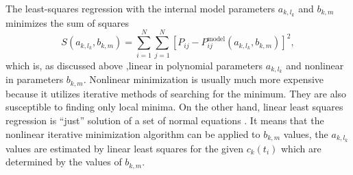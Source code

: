 The least-squares regression with the internal model parameters $a_{k,l_k}$ and
$b_{k,m}$ minimizes the sum of squares
\begin{equation*}
	S(a_{k,l_k},b_{k,m}) = \sum_{i=1}^N{\sum_{j=1}^N{
		\left[P_{ij} - P_{ij}^\text{model}(a_{k,l_k},b_{k,m})\right]^2
	}},
\end{equation*}
which is, as discussed above ,linear in polynomial parameters $a_{k,l_k}$ and
nonlinear in parameters $b_{k,m}$.
Nonlinear minimization is usually much more expensive because it utilizes
iterative methods of searching for the minimum.
They are also susceptible to finding only local minima.
On the other hand, linear least squares regression is “just” solution of a set
of normal equations
\parencite[p.~671]{NumericalRecipes}.
It means that the nonlinear iterative minimization algorithm can be applied
to $b_{k,m}$ values, the $a_{k,l_k}$ values are estimated by linear least
squares for the given $c_k(t_i)$ which are determined by the values of
$b_{k,m}$.
